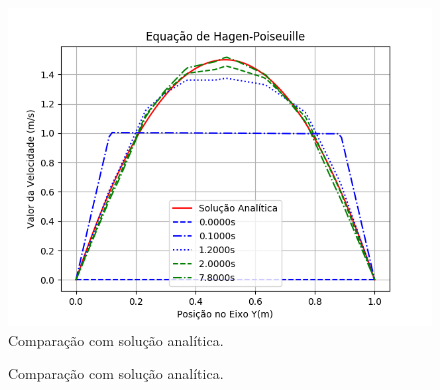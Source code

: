 \documentclass{beamer}
\begin{document}
\begin{frame}
\begin{minipage}{.36\textwidth}
\begin{figure}
{	\includegraphics[height=0.32\textheight]{figure/validations/Poiseuille_validation.png}
      } {\raggedleft \tiny Comparação com solução analítica.}
    \end{figure}
    \vspace*{-\baselineskip}\setlength\belowdisplayshortskip{0pt} %
    \begin{figure}
       {\raggedleft \tiny Comparação com solução analítica.}
    \end{figure}
  \end{minipage}
\end{frame}
\end{document}
